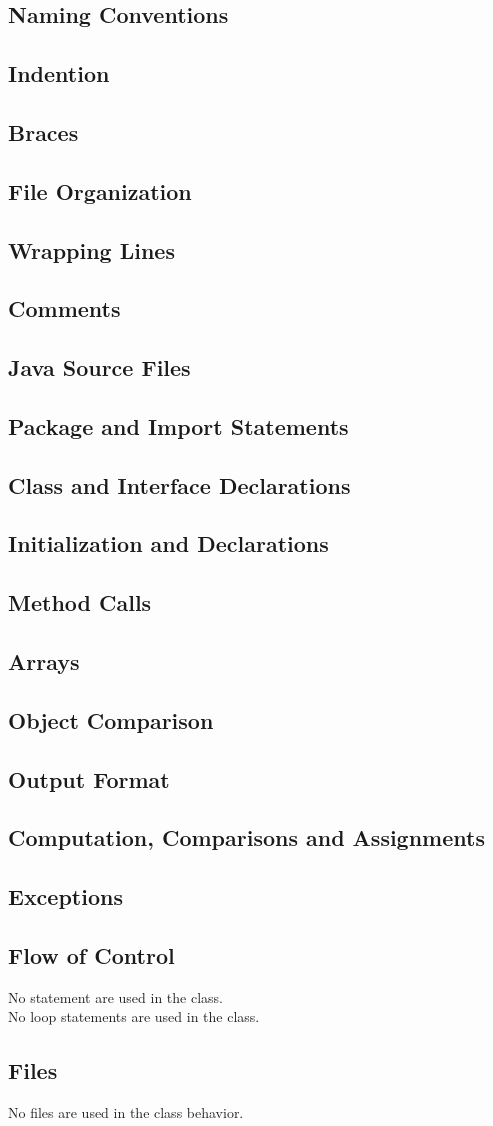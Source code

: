 

\subsection{Naming Conventions}
\subsection{Indention}
\subsection{Braces}
\subsection{File Organization}
\subsection{Wrapping Lines}
\subsection{Comments}
\subsection{Java Source Files}
\subsection{Package and Import Statements}
\subsection{Class and Interface Declarations}
\subsection{Initialization and Declarations}
\subsection{Method Calls}
\subsection{Arrays}
\subsection{Object Comparison}
\subsection{Output Format}
\subsection{Computation, Comparisons and Assignments}
\subsection{Exceptions}
\subsection{Flow of Control}
No  statement are used in the class.\\
No loop statements are used in the class.
\subsection{Files}
No files are used in the class behavior.